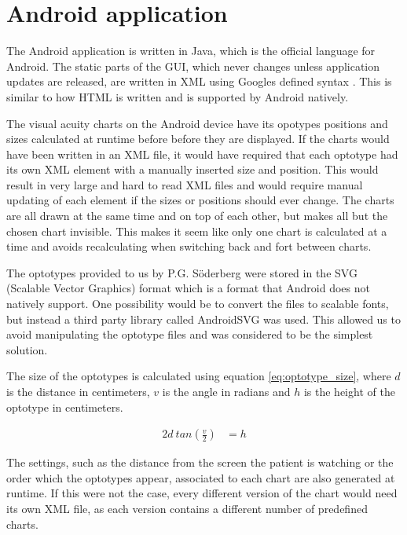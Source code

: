 \documentclass[12pt,a4paper,notitlepage]{report}
\begin{document}
\section{Android application}
The Android application is written in Java, which is the official language for Android. The static parts of the GUI, which never changes unless application updates are released, are written in XML using Googles defined syntax \cite{android_gui}. This is similar to how HTML is written and is supported by Android natively.

The visual acuity charts on the Android device have its opotypes positions and sizes calculated at runtime before before they are displayed. If the charts would have been written in an XML file, it would have required that each optotype had its own XML element with a manually inserted size and position. This would result in very large and hard to read XML files and would require manual updating of each element if the sizes or positions should ever change. The charts are all drawn at the same time and on top of each other, but makes all but the chosen chart invisible. This makes it seem like only one chart is calculated at a time and avoids recalculating when switching back and fort between charts.

The optotypes provided to us by P.G. Söderberg were stored in the SVG (Scalable Vector Graphics) format which is a format that Android does not natively support. One possibility would be to convert the files to scalable fonts, but instead a third party library called AndroidSVG \cite{AndroidSVG} was used. This allowed us to avoid manipulating the optotype files and was considered to be the simplest solution.


The size of the optotypes is calculated using equation \ref{eq:optotype_size}, where $d$ is the distance in centimeters, $v$ is the angle in radians and $h$ is the height of the optotype in centimeters.

\begin{equation}
	\begin{split}
  		2d\ tan(\frac{v}{2}) & = h
  	\end{split}
  	\label{eq:optotype_size}
\end{equation}

The settings, such as the distance from the screen the patient is watching or the order which the optotypes appear, associated to each chart are also generated at runtime. If this were not the case, every different version of the chart would need its own XML file, as each version contains a different number of predefined charts.
\end{document}
